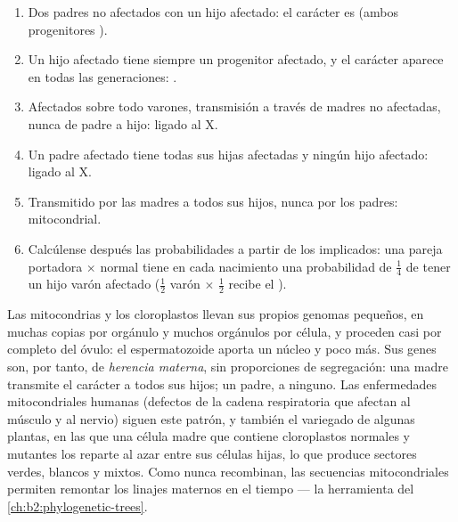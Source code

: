 \begin{method}\label{met:b2:meiosis-heredity:pedigree}
\begin{enumerate}
  \item Dos padres no afectados con un hijo afectado: el carácter es
         (ambos progenitores ).
  \item Un hijo afectado tiene siempre un progenitor afectado, y el
        carácter aparece en todas las generaciones: .
  \item Afectados sobre todo varones, transmisión a través de madres no
        afectadas, nunca de padre a hijo:  ligado al X.
  \item Un padre afectado tiene todas sus hijas afectadas y ningún hijo
        afectado:  ligado al X.
  \item Transmitido por las madres a todos sus hijos, nunca por los
        padres: mitocondrial.
  \item Calcúlense después las probabilidades a partir de los 
        implicados: una pareja portadora $\times$ normal tiene en cada
        nacimiento una probabilidad de $\tfrac14$ de tener un hijo varón
        afectado ($\tfrac12$ varón $\times$ $\tfrac12$ recibe el ).
\end{enumerate}
\end{method}

\begin{definition}\label{def:b2:meiosis-heredity:extranuclear}
Las mitocondrias y los cloroplastos llevan sus propios genomas pequeños,
en muchas copias por orgánulo y muchos orgánulos por célula, y proceden
casi por completo del óvulo: el espermatozoide aporta un núcleo y poco
más. Sus genes son, por tanto, de \emph{herencia
materna}, sin proporciones de segregación: una madre transmite el
carácter a todos sus hijos; un padre, a ninguno. Las enfermedades
mitocondriales humanas (defectos de la cadena respiratoria que afectan al
músculo y al nervio) siguen este patrón, y también el variegado de
algunas plantas, en las que una célula madre que contiene cloroplastos
normales y mutantes los reparte al azar entre sus células hijas, lo que
produce sectores verdes, blancos y mixtos. Como nunca recombinan, las
secuencias mitocondriales permiten remontar los linajes maternos en el
tiempo --- la herramienta del \cref{ch:b2:phylogenetic-trees}.
\end{definition}

